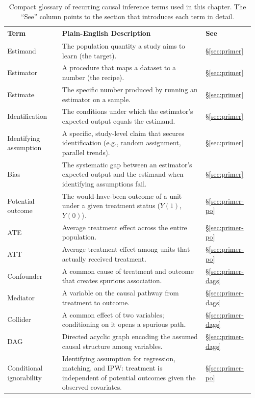 \begin{table}[t]
\centering
\caption{Compact glossary of recurring causal inference terms used in this chapter.
The ``See'' column points to the section that introduces each term in detail.}
\label{tab:glossary}
\footnotesize
\begin{tabularx}{\linewidth}{@{} p{3.0cm} X p{1.5cm} @{}}
\toprule
\textbf{Term} & \textbf{Plain-English Description} & \textbf{See} \\
\midrule
Estimand & The population quantity a study aims to learn (the target). & \S\ref{sec:primer} \\
Estimator & A procedure that maps a dataset to a number (the recipe). & \S\ref{sec:primer} \\
Estimate & The specific number produced by running an estimator on a sample. & \S\ref{sec:primer} \\
Identification & The conditions under which the estimator's expected output equals the estimand. & \S\ref{sec:primer} \\
Identifying assumption & A specific, study-level claim that secures identification (e.g., random assignment, parallel trends). & \S\ref{sec:primer} \\
Bias & The systematic gap between an estimator's expected output and the estimand when identifying assumptions fail. & \S\ref{sec:primer} \\
\addlinespace
Potential outcome & The would-have-been outcome of a unit under a given treatment status ($Y(1)$, $Y(0)$). & \S\ref{sec:primer-po} \\
ATE & Average treatment effect across the entire population. & \S\ref{sec:primer-po} \\
ATT & Average treatment effect among units that actually received treatment. & \S\ref{sec:primer-po} \\
\addlinespace
Confounder & A common cause of treatment and outcome that creates spurious association. & \S\ref{sec:primer-dags} \\
Mediator & A variable on the causal pathway from treatment to outcome. & \S\ref{sec:primer-dags} \\
Collider & A common effect of two variables; conditioning on it opens a spurious path. & \S\ref{sec:primer-dags} \\
DAG & Directed acyclic graph encoding the assumed causal structure among variables. & \S\ref{sec:primer-dags} \\
\addlinespace
Conditional ignorability & Identifying assumption for regression, matching, and IPW: treatment is independent of potential outcomes given the observed covariates. & \S\ref{sec:primer-po} \\

\end{tabularx}
\end{table}
